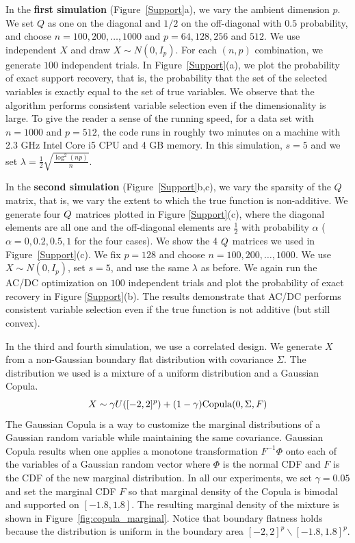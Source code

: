 In the \textbf{first simulation} (Figure~\ref{Support}a), we vary the ambient dimension $p$. We set $Q$ as one on the diagonal and $1/2$ on the off-diagonal with $0.5$ probability, and choose $n=100, 200,\ldots,1000$ and $p=64,128,256$ and $512$. We use independent $X$ and draw $X \sim N(0, I_p)$.
For each $(n,p)$ combination, we generate $100$ independent trials. 
In Figure~\ref{Support}(a), we plot the probability of exact
support recovery, that is, the probability that the set of the selected variables is exactly equal to the set of true variables.  We observe that the algorithm performs consistent variable selection even if the dimensionality is large. To give the reader a
sense of the running speed, for a 
data set with $n=1000$ and $p=512$, the code runs in roughly two 
minutes on a machine with 2.3 GHz Intel Core i5 CPU and 4 GB memory. In this simulation, $s=5$ and we set $\lambda = \frac{1}{2} \sqrt{ \frac{\log^2(np)}{n} }$.


In the \textbf{second simulation} (Figure~\ref{Support}b,c), we vary the sparsity of the $Q$ matrix, that is, we vary the extent to which the true function is non-additive. We generate four $Q$ matrices
plotted in Figure \ref{Support}(c), where the diagonal elements are all one and
the off-diagonal elements are $\frac{1}{2}$ with probability $\alpha$
($\alpha=0,0.2,0.5,1$ for the four cases). We show the 4 $Q$ matrices we used in Figure~\ref{Support}(c).
We fix $p=128$ and choose
$n=100,200,\ldots,1000$. We use $X \sim N(0,I_p)$, set $s=5$, and use the same $\lambda$ as before.  We again run the AC/DC optimization on $100$
independent trials and plot the probability of exact recovery
in Figure \ref{Support}(b). The results demonstrate that AC/DC performs
consistent variable selection even if the true function is not additive (but
still convex). 

In the third and fourth simulation, we use a correlated design. We generate $X$ from a non-Gaussian boundary flat distribution with covariance $\Sigma$. The distribution we used is a mixture of a uniform distribution and a Gaussian Copula.
\[
X \sim \gamma U([-2, 2]^p) + (1-\gamma) \textrm{Copula}(0, \Sigma, F)
\]
The Gaussian Copula is a way to customize the marginal distributions of a Gaussian random variable while maintaining the same covariance. Gaussian Copula results when one applies a monotone transformation $F^{-1} \Phi$ onto each of the variables of a Gaussian random vector where $\Phi$ is the normal CDF and $F$ is the CDF of the new marginal distribution. In all our experiments, we set $\gamma = 0.05$ and set the marginal CDF $F$ so that marginal density of the Copula is bimodal and supported on $[-1.8, 1.8]$. The resulting marginal density of the mixture is shown in Figure~\ref{fig:copula_marginal}. Notice that boundary flatness holds because the distribution is uniform in the boundary area $[-2,2]^p \backslash [-1.8, 1.8]^p$.

